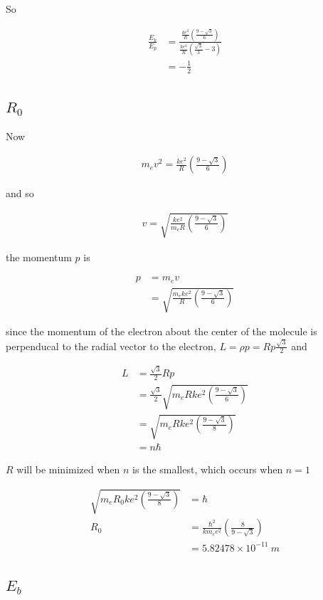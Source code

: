 \documentclass{article}
\begin{document}
So

\begin{align*}
\frac{E_k}{E_p} &= \frac{\frac{ke^2}{R}\left(\frac{9 - \sqrt 3}{6}\right)}{\frac{ke^2}{R} \left(\frac{\sqrt 3}{3} - 3\right)} \\
&= -\frac{1}{2}
\end{align*}

\subsection{$R_0$}

Now

\begin{align*}
m_e v^2 = \frac{ke^2}{R}\left(\frac{9 - \sqrt 3}{6}\right)
\end{align*}

and so

\begin{align*}
v = \sqrt{\frac{ke^2}{m_eR}\left(\frac{9 - \sqrt 3}{6}\right)}
\end{align*}

the momentum $p$ is

\begin{align*}
p &= m_e v \\
&= \sqrt{\frac{m_eke^2}{R}\left(\frac{9 - \sqrt 3}{6}\right)}
\end{align*}

since the momentum of the electron about the center of the molecule is perpenducal to the radial vector to the electron, $L = \rho p = Rp \frac{\sqrt{3}}{2}$ and

\begin{align*}
L &= \frac{\sqrt{3}}{2} R p \\
&= \frac{\sqrt{3}}{2} \sqrt{m_eRke^2\left(\frac{9 - \sqrt 3}{6}\right)} \\
&= \sqrt{m_eRke^2\left(\frac{9 - \sqrt 3}{8}\right)} \\
&= n\hbar
\end{align*}

$R$ will be minimized when $n$ is the smallest, which occurs when $n=1$

\begin{align*}
\sqrt{m_eR_0ke^2\left(\frac{9 - \sqrt 3}{8}\right)} &= \hbar \\
R_0 &= \frac{\hbar^2}{km_e e^2} \left(\frac{8}{9 - \sqrt 3}\right) \\
&= 5.82478 \times 10^{-11}\ m
\end{align*}

\subsection{$E_b$}
\end{document}
